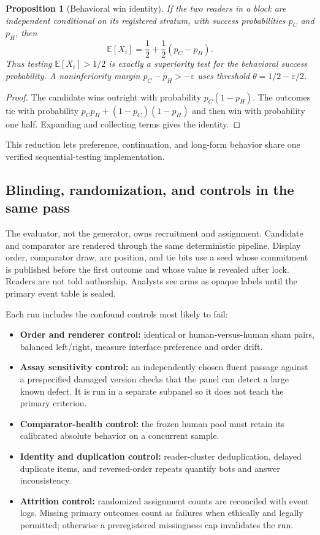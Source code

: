 \documentclass[11pt]{article}
\newtheorem{proposition}{Proposition}
\theoremstyle{remark}
\newcommand{\E}{\mathbb{E}}
\begin{document}
\begin{proposition}[Behavioral win identity]
If the two readers in a block are independent conditional on its registered stratum, with
success probabilities $p_C$ and $p_H$, then
\[
  \E[X_i]=\frac12+\frac12(p_C-p_H).
\]
Thus testing $\E[X_i]>1/2$ is exactly a superiority test for the behavioral success
probability. A noninferiority margin $p_C-p_H>-\varepsilon$ uses threshold
$\theta=1/2-\varepsilon/2$.
\end{proposition}

\begin{proof}
The candidate wins outright with probability $p_C(1-p_H)$. The outcomes tie with
probability $p_Cp_H+(1-p_C)(1-p_H)$ and then win with probability one half. Expanding and
collecting terms gives the identity.
\end{proof}

This reduction lets preference, continuation, and long-form behavior share one verified
sequential-testing implementation.

\subsection{Blinding, randomization, and controls in the same pass}

The evaluator, not the generator, owns recruitment and assignment. Candidate and comparator
are rendered through the same deterministic pipeline. Display order, comparator draw, arc
position, and tie bits use a seed whose commitment is published before the first outcome and
whose value is revealed after lock. Readers are not told authorship. Analysts see arms as
opaque labels until the primary event table is sealed.

Each run includes the confound controls most likely to fail:

\begin{itemize}
  \item \textbf{Order and renderer control:} identical or human-versus-human sham pairs,
  balanced left/right, measure interface preference and order drift.
  \item \textbf{Assay sensitivity control:} an independently chosen fluent passage against
  a prespecified damaged version checks that the panel can detect a large known defect. It
  is run in a separate subpanel so it does not teach the primary criterion.
  \item \textbf{Comparator-health control:} the frozen human pool must retain its calibrated
  absolute behavior on a concurrent sample.
  \item \textbf{Identity and duplication control:} reader-cluster deduplication, delayed
  duplicate items, and reversed-order repeats quantify bots and answer inconsistency.
  \item \textbf{Attrition control:} randomized assignment counts are reconciled with event
  logs. Missing primary outcomes count as failures when ethically and legally permitted;
  otherwise a preregistered missingness cap invalidates the run.
\end{itemize}
\end{document}
